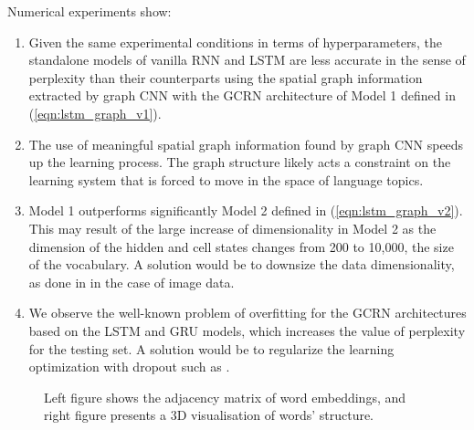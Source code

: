 \documentclass{article} %
\newcommand{\eqnref}[1]{(\ref{eqn:#1})}
\begin{document}
Numerical experiments show:
\vspace{-0.25cm}
\begin{enumerate}
\item Given the same experimental conditions in terms of hyperparameters, the standalone models of vanilla RNN and LSTM are less accurate in the sense of perplexity than their counterparts using the spatial graph information extracted by graph CNN with the GCRN architecture of Model 1 defined in \eqnref{lstm_graph_v1}.
\item The use of meaningful spatial graph information found by graph CNN speeds up the learning process. The graph structure likely acts a constraint on the learning system that is forced to move in the space of language topics.
\item Model 1 outperforms significantly Model 2 defined in \eqnref{lstm_graph_v2}. This may result of the large increase of dimensionality in Model 2 as the dimension of the hidden and cell states changes from 200 to 10,000, the size of the vocabulary. A solution would be to downsize the data dimensionality, as done in \cite{convlstm} in the case of image data.
\item We observe the well-known problem of overfitting for the GCRN architectures based on the LSTM and GRU models, which increases the value of perplexity for the testing set. A solution would be to regularize the learning optimization with dropout such as \cite{srivastava2013improving,zaremba2014recurrent}.
\end{enumerate}




\begin{figure}[h!]
\centering
{}
\hspace{0.5cm}
\caption{Left figure shows the adjacency matrix of word embeddings, and right figure presents a 3D visualisation of words' structure.}
\label{fig2}
\end{figure}
\end{document}
